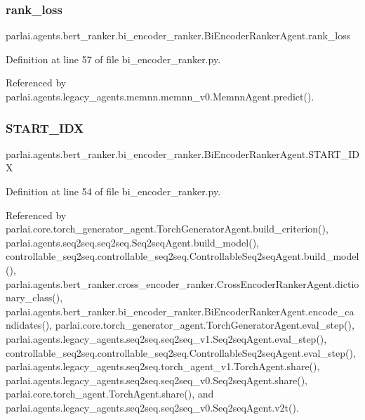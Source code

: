 \subsubsection{\texorpdfstring{rank\+\_\+loss}{rank\_loss}}
{\footnotesize\ttfamily parlai.\+agents.\+bert\+\_\+ranker.\+bi\+\_\+encoder\+\_\+ranker.\+Bi\+Encoder\+Ranker\+Agent.\+rank\+\_\+loss}



Definition at line 57 of file bi\+\_\+encoder\+\_\+ranker.\+py.



Referenced by parlai.\+agents.\+legacy\+\_\+agents.\+memnn.\+memnn\+\_\+v0.\+Memnn\+Agent.\+predict().

\mbox{\label{classparlai_1_1agents_1_1bert__ranker_1_1bi__encoder__ranker_1_1BiEncoderRankerAgent_ac5a405ed8a3f8cefbc1f544d997f4223}} 
\subsubsection{\texorpdfstring{S\+T\+A\+R\+T\+\_\+\+I\+DX}{START\_IDX}}
{\footnotesize\ttfamily parlai.\+agents.\+bert\+\_\+ranker.\+bi\+\_\+encoder\+\_\+ranker.\+Bi\+Encoder\+Ranker\+Agent.\+S\+T\+A\+R\+T\+\_\+\+I\+DX}



Definition at line 54 of file bi\+\_\+encoder\+\_\+ranker.\+py.



Referenced by parlai.\+core.\+torch\+\_\+generator\+\_\+agent.\+Torch\+Generator\+Agent.\+build\+\_\+criterion(), parlai.\+agents.\+seq2seq.\+seq2seq.\+Seq2seq\+Agent.\+build\+\_\+model(), controllable\+\_\+seq2seq.\+controllable\+\_\+seq2seq.\+Controllable\+Seq2seq\+Agent.\+build\+\_\+model(), parlai.\+agents.\+bert\+\_\+ranker.\+cross\+\_\+encoder\+\_\+ranker.\+Cross\+Encoder\+Ranker\+Agent.\+dictionary\+\_\+class(), parlai.\+agents.\+bert\+\_\+ranker.\+bi\+\_\+encoder\+\_\+ranker.\+Bi\+Encoder\+Ranker\+Agent.\+encode\+\_\+candidates(), parlai.\+core.\+torch\+\_\+generator\+\_\+agent.\+Torch\+Generator\+Agent.\+eval\+\_\+step(), parlai.\+agents.\+legacy\+\_\+agents.\+seq2seq.\+seq2seq\+\_\+v1.\+Seq2seq\+Agent.\+eval\+\_\+step(), controllable\+\_\+seq2seq.\+controllable\+\_\+seq2seq.\+Controllable\+Seq2seq\+Agent.\+eval\+\_\+step(), parlai.\+agents.\+legacy\+\_\+agents.\+seq2seq.\+torch\+\_\+agent\+\_\+v1.\+Torch\+Agent.\+share(), parlai.\+agents.\+legacy\+\_\+agents.\+seq2seq.\+seq2seq\+\_\+v0.\+Seq2seq\+Agent.\+share(), parlai.\+core.\+torch\+\_\+agent.\+Torch\+Agent.\+share(), and parlai.\+agents.\+legacy\+\_\+agents.\+seq2seq.\+seq2seq\+\_\+v0.\+Seq2seq\+Agent.\+v2t().

